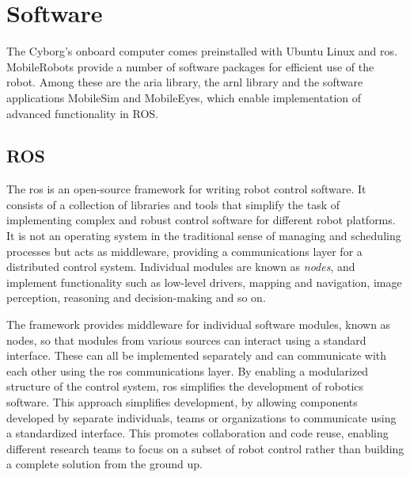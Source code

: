 \documentclass[\rootfolder/main.tex]{subfiles}
\begin{document}

\section{Software}

The Cyborg's onboard computer comes preinstalled with Ubuntu Linux and \acrshort{ros}.
MobileRobots provide a number of software packages for efficient use of the robot. 
Among these are the \acrfull{aria} library, the \acrfull{arnl} library and the software applications MobileSim and MobileEyes, which enable implementation of advanced functionality in ROS.


\subsection{ROS}

The \acrfull{ros} is an open-source framework for writing robot control software.
It consists of a collection of libraries and tools that simplify the task of implementing complex and robust control software for different robot platforms.
It is not an operating system in the traditional sense of managing and scheduling processes but acts as middleware, providing a communications layer for a distributed control system.
Individual modules are known as \emph{nodes}, and implement functionality such as low-level drivers, mapping and navigation, image perception, reasoning and decision-making and so on.

The framework provides middleware for individual software modules, known as nodes, so that modules from various sources can interact using a standard interface.
These can all be implemented separately and can communicate with each other using the \acrshort{ros} communications layer.
By enabling a modularized structure of the control system, \acrshort{ros} simplifies the development of robotics software.
This approach simplifies development, by allowing components developed by separate individuals, teams or organizations to communicate using a standardized interface.
This promotes collaboration and code reuse, enabling different research teams to focus on a subset of robot control rather than building a complete solution from the ground up.
\end{document}
